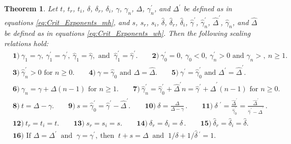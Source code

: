 \documentclass[english,12pt,jmp,graphicx]{revtex4-1}
\newtheorem{theorem}{Theorem}[section]
\newcommand{\gh}{\hat{\gamma}}
\newcommand{\Dh}{\hat{\Delta}}
\newcommand{\dha}{\hat{\delta}}
\begin{document}
\begin{theorem} \label{thm:Crit_Theory_m_w}
  Let $t$, $t_r$, $t_i$, $\delta$, $\delta_r$, $\delta_i$, $\gamma$, $\gamma_n$, $\Delta$, $\gamma_n^\prime$,
  and $\Delta^\prime$ be   defined as in equations \eqref{eq:Crit_Exponents_mh},
  and $s$, $s_r$, $s_i$, $\dha$, $\dha_r$, $\dha_i$, $\gh^\prime$, $\gh_n^\prime$,
  $\Dh^\prime$, $\gh_n$, and $\Dh$ be defined as in equations
  \eqref{eq:Crit_Exponents_wh}. Then the following scaling relations
  hold:
%  
  \begin{align*}   
   &\mathbf{1)} \ \gamma_1=\gamma, \ \gamma_1^\prime=\gamma^\prime, \ \gh_1=\gh, \text{ and } \ \gh_1^\prime=\gh^\prime. \qquad
     \mathbf{2)} \ \gamma_0^\prime=0, \ \gamma_0<0, \ \gamma_n^\prime>0 \text{ and } \gamma_n>, \ n\geq1.\\
   &\mathbf{3)} \ \gh_n^\prime>0 \text{ for } n\geq0. \qquad
   \mathbf{4)} \ \gamma=\gh_0 \text{ and } \Delta=\Dh. \qquad
   \mathbf{5)} \ \gamma^\prime=\gh_0^\prime \text{ and } \Delta^\prime=\Dh^\prime. \\
   &\mathbf{6)} \ \gamma_n=\gamma+\Delta(n-1) \text{ for } n\geq1. \qquad
   \mathbf{7)} \ \gh_n^\prime=\gh_0^\prime+\Dh^\prime n=\gh^\prime+\Dh^\prime(n-1) \text{ for } n\geq0. \\
   &\mathbf{8)} \ t=\Delta-\gamma. \qquad 
   \mathbf{9)} \ s=\gh_0^\prime=\gh^\prime-\Dh^\prime. \qquad
   \mathbf{10)} \ \delta=\frac{\Delta}{\Delta-\gamma}\,. \qquad
   \mathbf{11)} \ \dha\;^\prime=\frac{\Dh^\prime}{\gh_0^\prime}=\frac{\Dh^\prime}{\gh^\prime-\Dh^\prime}\,. \\
   &\mathbf{12)} \ t_r=t_i=t. \qquad
   \mathbf{13)} \ s_r=s_i=s. \qquad
   \mathbf{14)}  \ \delta_r=\delta_i=\delta\,. \qquad
   \mathbf{15)} \ \dha_r=\dha_i=\dha. \\
   &\mathbf{16)} \text{ If } \Delta=\Delta^\prime \ \text{ and } \ \gamma=\gamma^\prime, \ \text{
     then } \ t+s=\Delta \ \text{ and } \ 1/\delta+1/\dha\,^\prime=1.
  \end{align*}
%  
\end{theorem}
%
\end{document}
